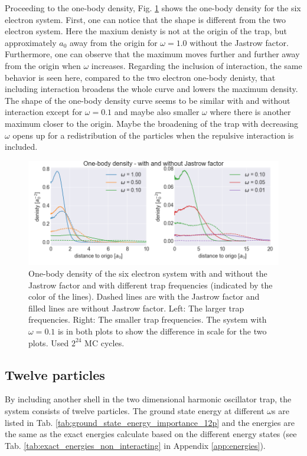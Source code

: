 Proceeding to the one-body density, Fig. \ref{fig:one_body_density_interaction_6p} shows the one-body density for the six electron system. First, one can notice that the shape is different from the two electron system. Here the maxium denisty is not at the origin of the trap, but approximately $a_0$ away from the origin for $\omega=1.0$ without the Jastrow factor. Furthermore, one can observe that the maximum moves further and further away from the origin when $\omega$ increases. Regarding the inclusion of interaction, the same behavior is seen here, compared to the two electron one-body denisty, that including interaction  broadens the whole curve and lowers the maximum density. The shape of the one-body density curve seems to be similar with and without interaction except for $\omega = 0.1$ and maybe also smaller $\omega$ where there is another maximum closer to the origin. Maybe the broadening of the trap with decreasing $\omega$ opens up for a redistribution of the particles when the repulsive interaction is included. 

\begin{figure}[H]
\center
\includegraphics[width=0.85\linewidth]{../Results/one_body_density_interaction_6p}\caption{One-body density of the six electron system with and without the Jastrow factor and with different trap frequencies (indicated by the color of the lines). Dashed lines are with the Jastrow factor and filled lines are without Jastrow factor. Left: The larger trap frequencies. Right: The smaller trap frequencies.  The system with $\omega = 0.1$ is in both plots to show the difference in scale for the two plots. Used $2^{24}$ MC cycles. }\label{fig:one_body_density_interaction_6p}
\end{figure}


\subsection{Twelve particles}

By including another shell in the two dimensional harmonic oscillator trap, the system consists of twelve particles. The ground state energy at different $\omega$s are listed in Tab. \ref{tab:ground_state_energy_importance_12p} and the energies are the same as the exact energies calculate based on the different energy states (see Tab. \ref{tab:exact_energies_non_interacting} in Appendix \ref{app:energies}).

